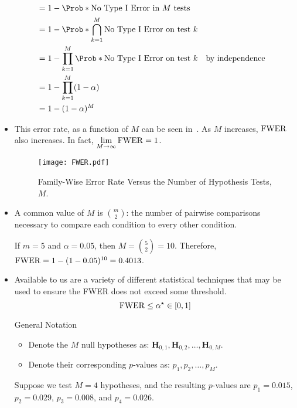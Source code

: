 \begin{itemize}
\begin{align*}
               & =1-\Prob*{\text{No Type I Error in $ M $ tests}}                                           \\
               & =1-\Prob*{\bigcap_{k=1}^M\text{No Type I Error on test $ k $}}                             \\
               & =1-\prod_{k=1}^M\Prob*{\text{No Type I Error on test $ k $}}   &  & \text{by independence} \\
               & =1-\prod_{k=1}^M(1-\alpha)                                                                 \\
               & =1-(1-\alpha)^M
          \end{align*}
    \item This error rate, as a function of $M$ can be seen in~. As $ M $ increases, $ \operatorname{FWER} $ also increases.
          In fact, $ \lim\limits_{{M} \to {\infty}} \operatorname{FWER}=1 $.
          \begin{figure}[!htbp]
              \centering
              \texttt{[image: FWER.pdf]}
              \caption{Family-Wise Error Rate Versus the Number of Hypothesis Tests, $M$.}\label{fig:FWER}
          \end{figure}
    \item A common value of $ M $ is $ \binom{m}{2} $: the number of pairwise comparisons necessary to compare each condition
          to every other condition.
          \begin{Example}{}{}
              If $ m=5 $ and $ \alpha=0.05 $, then $ M=\binom{5}{2}=10 $. Therefore, $ \operatorname{FWER}=1-(1-0.05)^{10}=0.4013 $.
          \end{Example}
    \item Available to us are a variety of different statistical techniques that may be used to ensure the FWER
          does not exceed some threshold.
          \[ \operatorname{FWER}\le \alpha^\star \in[0,1] \]
          \begin{Remark}{General Notation}{}
              \begin{itemize}
                  \item Denote the $ M $ null hypotheses as: $ \mathbf{H}_{0,1},\mathbf{H}_{0,2},\ldots,\mathbf{H}_{0,M} $.
                  \item Denote their corresponding $ p $-values as: $ p_1,p_2,\ldots,p_M $.
              \end{itemize}
          \end{Remark}
          \begin{Example}{}{}
              Suppose we test $ M =4 $ hypotheses, and the resulting $ p $-values are $ p_1 =0.015$, $ p_2=0.029 $,
              $ p_3=0.008 $, and $ p_4=0.026 $.
          \end{Example}
\end{itemize}
